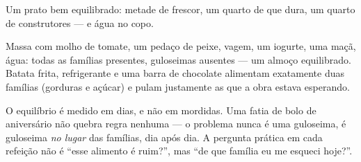 \begin{omfigure}

{\small Um prato bem equilibrado: metade de frescor, um quarto de
 que dura, um quarto de construtores --- e água no copo.}
\end{omfigure}

\begin{example}\label{ex:g3:balanced-diet:lunch}
Massa com molho de tomate, um pedaço de peixe, vagem, um iogurte,
uma maçã, água: todas as famílias presentes, guloseimas ausentes ---
um almoço equilibrado. Batata frita, refrigerante e uma barra de
chocolate alimentam exatamente duas famílias (gorduras e açúcar) e
pulam justamente as que a obra estava esperando.
\end{example}

\begin{remark}\label{rem:g3:balanced-diet:balance}
O equilíbrio é medido em dias, e não em mordidas. Uma fatia de bolo
de aniversário não quebra regra nenhuma --- o problema nunca é uma
guloseima, é guloseima \emph{no lugar} das famílias, dia após dia. A
pergunta prática em cada refeição não é ``esse alimento é ruim?'',
mas ``de que família eu me esqueci hoje?''.
\end{remark}

